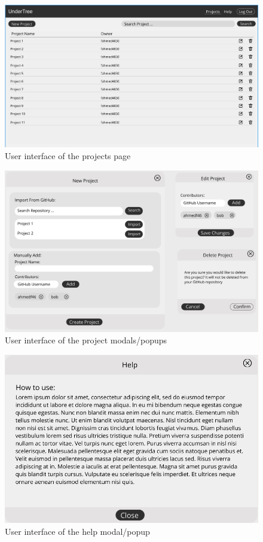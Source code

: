 \documentclass[12pt, titlepage]{article}
\begin{document}
	\begin{figure}[H]
		\centering
		\includegraphics[width=\linewidth]{projectsPage.png}
		\caption{User interface of the projects page}
	\end{figure}
	
	\begin{figure}[H]
		\centering
		\includegraphics[width=\linewidth]{projectModals.png}
		\caption{User interface of the project modals/popups}
	\end{figure}
	
	\begin{figure}[H]
		\centering
		\includegraphics[width=\linewidth]{helpModal.png}
		\caption{User interface of the help modal/popup}
	\end{figure}
	
\end{document}
